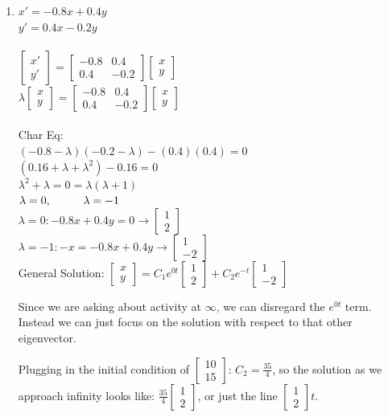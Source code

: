 \documentclass{article}
\newcommand\tab[1][1cm]{\hspace*{#1}}
\newcommand{\newVec}[2]{\begin{bmatrix}#1 \\ #2 \end{bmatrix}}
\newcommand{\newtt}[4]{\begin{bmatrix}#1 & #2\\ #3 & #4 \end{bmatrix}}
\begin{document}
\begin{enumerate}
\item
\tab $x' = -0.8x +0.4y$\\ 
\tab $y' = 0.4x -0.2y$\\\\
$  \newVec{x'}{y'} = \newtt{-0.8}{0.4}{0.4}{-0.2} \newVec{x}{y}$\\
$\lambda \newVec{x}{y} = \newtt{-0.8}{0.4}{0.4}{-0.2} \newVec{x}{y}$\\\\
Char Eq:\\ $(-0.8 - \lambda)(-0.2 - \lambda) - (0.4)(0.4) = 0$\\
$(0.16 + \lambda + \lambda^2) - 0.16 = 0$\\
$\lambda^2 + \lambda = 0 = \lambda(\lambda + 1)$\\
$\lambda = 0, \tab \lambda = -1$\\
$\lambda = 0: -0.8x +0.4y = 0 \rightarrow \newVec{1}{2}$\\
$\lambda = -1: -x = -0.8x +0.4y \rightarrow \newVec{1}{-2}$\\
General Solution: $\newVec{x}{y} = C_1e^{0t}\newVec{1}{2} + C_2e^{-t}\newVec{1}{-2}$\par
Since we are asking about activity at $\infty$, we can disregard the $e^{0t}$ term. Instead we can just focus on the solution with respect to that other eigenvector.\par
Plugging in the initial condition of $\newVec{10}{15}$: $C_2 = \frac{35}{4}$, so the solution as we approach infinity looks like: $\frac{35}{4} \newVec{1}{2}$, or just the line $\newVec{1}{2}t$. \\


\end{enumerate}
\end{document}
